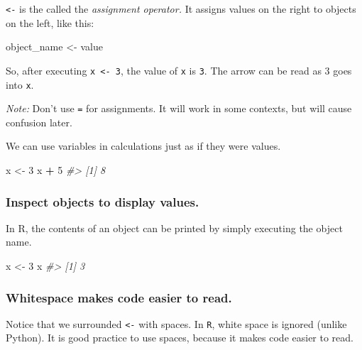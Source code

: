 \documentclass[]{book}
\newenvironment{Shaded}{\begin{snugshade}}{\end{snugshade}}
\newcommand{\DecValTok}[1]{\textcolor[rgb]{0.00,0.00,0.81}{#1}}
\newcommand{\StringTok}[1]{\textcolor[rgb]{0.31,0.60,0.02}{#1}}
\newcommand{\CommentTok}[1]{\textcolor[rgb]{0.56,0.35,0.01}{\textit{#1}}}
\newcommand{\OperatorTok}[1]{\textcolor[rgb]{0.81,0.36,0.00}{\textbf{#1}}}
\newcommand{\NormalTok}[1]{#1}
\begin{document}
\texttt{\textless{}-} is the called the \emph{assignment operator.} It
assigns values on the right to objects on the left, like this:

\begin{Shaded}
\begin{Highlighting}[]
\NormalTok{object_name <-}\StringTok{ }\NormalTok{value}
\end{Highlighting}
\end{Shaded}

So, after executing \texttt{x\ \textless{}-\ 3}, the value of \texttt{x}
is \texttt{3}. The arrow can be read as 3 goes into \texttt{x}.

\emph{Note:} Don't use \texttt{=} for assignments. It will work in some
contexts, but will cause confusion later.

We can use variables in calculations just as if they were values.

\begin{Shaded}
\begin{Highlighting}[]
\NormalTok{x <-}\StringTok{ }\DecValTok{3}
\NormalTok{x }\OperatorTok{+}\StringTok{ }\DecValTok{5}
\CommentTok{#> [1] 8}
\end{Highlighting}
\end{Shaded}

\subsubsection*{Inspect objects to display
values.}\label{inspect-objects-to-display-values.}

In R, the contents of an object can be printed by simply executing the
object name.

\begin{Shaded}
\begin{Highlighting}[]
\NormalTok{x <-}\StringTok{ }\DecValTok{3}
\NormalTok{x}
\CommentTok{#> [1] 3}
\end{Highlighting}
\end{Shaded}

\subsubsection*{Whitespace makes code easier to
read.}\label{whitespace-makes-code-easier-to-read.}

Notice that we surrounded \texttt{\textless{}-} with spaces. In
\texttt{R}, white space is ignored (unlike Python). It is good practice
to use spaces, because it makes code easier to read.
\end{document}
